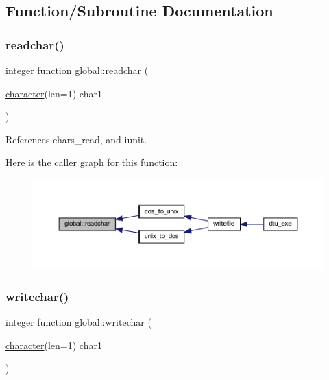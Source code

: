 \subsection{Function/\+Subroutine Documentation}
\mbox{\label{namespaceglobal_ac0b651e598e238c7eacf10df65cd92b2}} 
\subsubsection{\texorpdfstring{readchar()}{readchar()}}
{\footnotesize\ttfamily integer function global\+::readchar (\begin{DoxyParamCaption}\item[{\hyperlink{option__stopwatch_83_8txt_abd4b21fbbd175834027b5224bfe97e66}{character}(len=1)}]{char1 }\end{DoxyParamCaption})}



References chars\+\_\+read, and iunit.

Here is the caller graph for this function\+:
\nopagebreak
\begin{figure}[H]
\begin{center}
\leavevmode
\includegraphics[width=350pt]{namespaceglobal_ac0b651e598e238c7eacf10df65cd92b2_icgraph}
\end{center}
\end{figure}
\mbox{\label{namespaceglobal_aa4c95f5c7250975b756bcd2131c3b88c}} 
\subsubsection{\texorpdfstring{writechar()}{writechar()}}
{\footnotesize\ttfamily integer function global\+::writechar (\begin{DoxyParamCaption}\item[{\hyperlink{option__stopwatch_83_8txt_abd4b21fbbd175834027b5224bfe97e66}{character}(len=1)}]{char1 }\end{DoxyParamCaption})}



